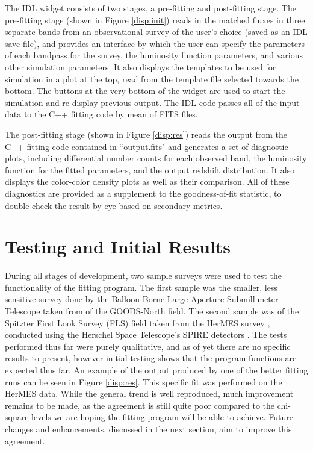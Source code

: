 \documentclass[twocolumn,letterpaper,10pt]{article}
\begin{document}
The IDL widget consists of two stages, a pre-fitting and post-fitting stage. The pre-fitting stage (shown in Figure \ref{disp:init}) reads in the matched fluxes in three separate bands from an observational survey of the user's choice (saved as an IDL save file), and provides an interface by which the user can specify the parameters of each bandpass for the survey, the luminosity function parameters, and various other simulation parameters. It also displays the templates to be used for simulation in a plot at the top, read from the template file selected towards the bottom. The buttons at the very bottom of the widget are used to start the simulation and re-display previous output. The IDL code passes all of the input data to the C++ fitting code by mean of FITS files.

The post-fitting stage (shown in Figure \ref{disp:res}) reads the output from the C++ fitting code contained in ``output.fits" and generates a set of diagnostic plots, including differential number counts for each observed band, the luminosity function for the fitted parameters, and the output redshift distribution. It also displays the color-color density plots as well as their comparison. All of these diagnostics are provided as a supplement to the goodness-of-fit statistic, to double check the result by eye based on secondary metrics.

\section{Testing and Initial Results}\label{example}
During all stages of development, two sample surveys were used to test the functionality of the fitting program. The first sample was the smaller, less sensitive survey done by the Balloon Borne Large Aperture Submillimeter Telescope taken from \citet{Devlin09} of the GOODS-North field. The second sample was of the Spitzter First Look Survey (FLS) field taken from the HerMES survey \citep{HerMES}, conducted using the Herschel Space Telescope's SPIRE detectors \citep{Herschel,SPIRE}. The tests performed thus far were purely qualitative, and as of yet there are no specific results to present, however initial testing shows that the program functions are expected thus far. An example of the output produced by one of the better fitting runs can be seen in Figure \ref{disp:res}. This specific fit was performed on the HerMES data. While the general trend is well reproduced, much improvement remains to be made, as the agreement is still quite poor compared to the chi-square levels we are hoping the fitting program will be able to achieve. Future changes and enhancements, discussed in the next section, aim to improve this agreement.
\end{document}
